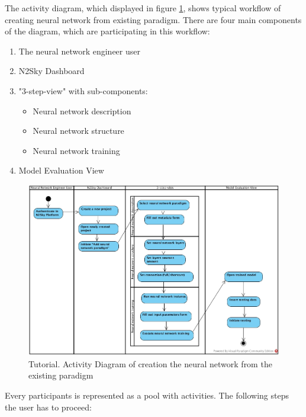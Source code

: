 The activity diagram, which displayed in figure \ref{fig:tutorial_engeneer}, shows typical workflow of creating neural network from existing paradigm. There are four main components of the diagram, which are participating in this workflow: 
\begin{enumerate}
\item The neural network engineer user
\item N2Sky Dashboard
\item "3-step-view" with sub-components:
\begin{itemize}
\item Neural network description
\item Neural network structure
\item Neural network training
\end{itemize}
\item Model Evaluation View
\end{enumerate}

\begin{figure}[htbp]
\begin{center}
  \includegraphics[width=\linewidth]{components/tutorial/img/tutorial_engeneer.jpg}
  \caption{Tutorial. Activity Diagram of creation the neural network from the existing paradigm}
  \label{fig:tutorial_engeneer}
\end{center}
\end{figure} 



Every participants is represented as a pool with activities. The following steps the user has to proceed:


